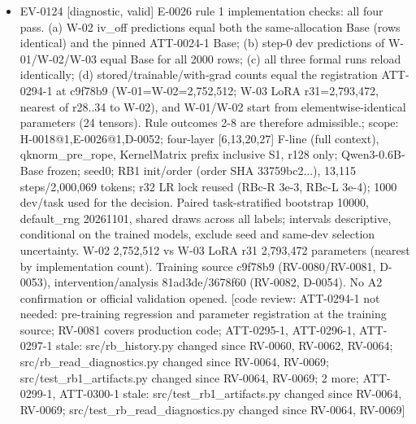 \documentclass[11pt]{article}
\begin{document}
\begin{itemize}
\item EV-0124 [diagnostic, valid] E-0026 rule 1 implementation checks: all four pass. (a) W-02 iv\_off predictions equal both the same-allocation Base (rows identical) and the pinned ATT-0024-1 Base; (b) step-0 dev predictions of W-01/W-02/W-03 equal Base for all 2000 rows; (c) all three formal runs reload identically; (d) stored/trainable/with-grad counts equal the registration ATT-0294-1 at c9f78b9 (W-01=W-02=2,752,512; W-03 LoRA r31=2,793,472, nearest of r28..34 to W-02), and W-01/W-02 start from elementwise-identical parameters (24 tensors). Rule outcomes 2-8 are therefore admissible.; scope: H-0018@1,E-0026@1,D-0052; four-layer [6,13,20,27] F-line (full context), qknorm\_pre\_rope, KernelMatrix prefix inclusive S1, r128 only; Qwen3-0.6B-Base frozen; seed0; RB1 init/order (order SHA 33759bc2...), 13,115 steps/2,000,069 tokens; r32 LR lock reused (RBc-R 3e-3, RBc-L 3e-4); 1000 dev/task used for the decision. Paired task-stratified bootstrap 10000, default\_rng 20261101, shared draws across all labels; intervals descriptive, conditional on the trained models, exclude seed and same-dev selection uncertainty. W-02 2,752,512 vs W-03 LoRA r31 2,793,472 parameters (nearest by implementation count). Training source c9f78b9 (RV-0080/RV-0081, D-0053), intervention/analysis 81ad3de/3678f60 (RV-0082, D-0054). No A2 confirmation or official validation opened. [code review: ATT-0294-1 not needed: pre-training regression and parameter registration at the training source; RV-0081 covers production code; ATT-0295-1, ATT-0296-1, ATT-0297-1 stale: src/rb\_history.py changed since RV-0060, RV-0062, RV-0064; src/rb\_read\_diagnostics.py changed since RV-0064, RV-0069; src/test\_rb1\_artifacts.py changed since RV-0064, RV-0069; 2 more; ATT-0299-1, ATT-0300-1 stale: src/test\_rb1\_artifacts.py changed since RV-0064, RV-0069; src/test\_rb\_read\_diagnostics.py changed since RV-0064, RV-0069]

\end{itemize}
\end{document}

